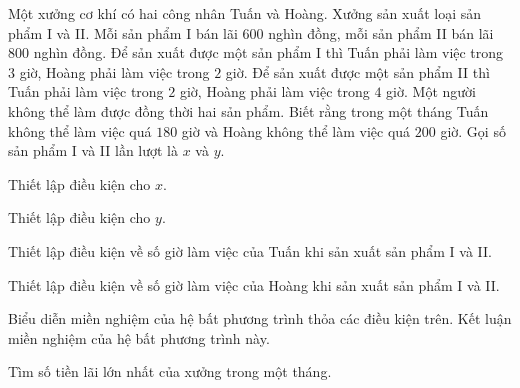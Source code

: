 \begin{bt}%
	Một xưởng cơ khí có hai công nhân Tuấn và Hoàng. Xưởng sản xuất loại sản phẩm I và II. Mỗi sản phẩm I bán lãi $600$ nghìn đồng, mỗi sản phẩm II bán lãi $800$ nghìn đồng. Để sản xuất được một sản phẩm I thì Tuấn phải làm việc trong $3$ giờ, Hoàng phải làm việc trong $2$ giờ. Để sản xuất được một sản phẩm II thì Tuấn phải làm việc trong $2$ giờ, Hoàng phải làm việc trong $4$ giờ. Một người không thể làm được đồng thời hai sản phẩm. Biết rằng trong một tháng Tuấn không thể làm việc quá $180$ giờ và Hoàng không thể làm việc quá $200$ giờ. Gọi số sản phẩm I và II lần lượt là $x$ và $y$.
	\begin{listEX}
		\item Thiết lập điều kiện cho $x$.
		\item Thiết lập điều kiện cho $y$.
		\item Thiết lập điều kiện về số giờ làm việc của Tuấn khi sản xuất sản phẩm I và II.
		\item Thiết lập điều kiện về số giờ làm việc của Hoàng khi sản xuất sản phẩm I và II.
		\item Biểu diễn miền nghiệm của hệ bất phương trình thỏa các điều kiện trên. Kết luận miền nghiệm của hệ bất phương trình này.
		\item Tìm số tiền lãi lớn nhất của xưởng trong một tháng.
	\end{listEX}
\end{bt}
